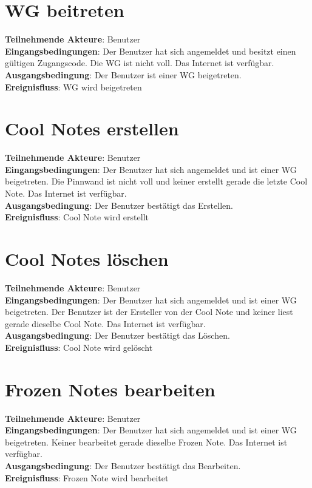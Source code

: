 \documentclass[a4paper]{scrreprt}
\begin{document}
		\section{WG beitreten}
		\textbf{Teilnehmende Akteure}: Benutzer \\
		\textbf{Eingangsbedingungen}: Der Benutzer hat sich angemeldet und besitzt einen gültigen Zugangscode. Die WG ist nicht voll. Das Internet ist verfügbar. \\
		\textbf{Ausgangsbedingung}: Der Benutzer ist einer WG beigetreten. \\
		\textbf{Ereignisfluss}: WG wird beigetreten
		
		\section{Cool Notes erstellen}
		\textbf{Teilnehmende Akteure}: Benutzer \\
		\textbf{Eingangsbedingungen}: Der Benutzer hat sich angemeldet und ist einer WG beigetreten. Die Pinnwand ist nicht voll und keiner erstellt gerade die letzte Cool Note. Das Internet ist verfügbar. \\
		\textbf{Ausgangsbedingung}: Der Benutzer bestätigt das Erstellen. \\
		\textbf{Ereignisfluss}: Cool Note wird erstellt
		
		\section{Cool Notes löschen}
		\textbf{Teilnehmende Akteure}: Benutzer \\
		\textbf{Eingangsbedingungen}: Der Benutzer hat sich angemeldet und ist einer WG beigetreten. Der Benutzer ist der Ersteller von der Cool Note und keiner liest gerade dieselbe Cool Note. Das Internet ist verfügbar. \\
		\textbf{Ausgangsbedingung}: Der Benutzer bestätigt das Löschen. \\
		\textbf{Ereignisfluss}: Cool Note wird gelöscht
		
		\section{Frozen Notes bearbeiten}
		\textbf{Teilnehmende Akteure}: Benutzer \\
		\textbf{Eingangsbedingungen}: Der Benutzer hat sich angemeldet und ist einer WG beigetreten. Keiner bearbeitet gerade dieselbe Frozen Note. Das Internet ist verfügbar. \\
		\textbf{Ausgangsbedingung}: Der Benutzer bestätigt das Bearbeiten. \\
		\textbf{Ereignisfluss}: Frozen Note wird bearbeitet
		
\end{document}
